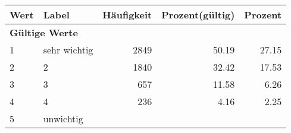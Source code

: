      \begin{longtable}{lXrrr}
     \toprule
     \textbf{Wert} & \textbf{Label} & \textbf{Häufigkeit} & \textbf{Prozent(gültig)} & \textbf{Prozent} \\
     \endhead
     \midrule
     \multicolumn{5}{l}{\textbf{Gültige Werte}}\\

     1 &
     \multicolumn{1}{X}{ sehr wichtig   } &


       \num{2849} &
       \num[round-mode=places,round-precision=2]{50.19} &
         \num[round-mode=places,round-precision=2]{27.15} \\

     2 &
     \multicolumn{1}{X}{ 2   } &


       \num{1840} &
       \num[round-mode=places,round-precision=2]{32.42} &
         \num[round-mode=places,round-precision=2]{17.53} \\

     3 &
     \multicolumn{1}{X}{ 3   } &


       \num{657} &
       \num[round-mode=places,round-precision=2]{11.58} &
         \num[round-mode=places,round-precision=2]{6.26} \\

     4 &
     \multicolumn{1}{X}{ 4   } &


       \num{236} &
       \num[round-mode=places,round-precision=2]{4.16} &
         \num[round-mode=places,round-precision=2]{2.25} \\

     5 &
     \multicolumn{1}{X}{ unwichtig   } &



\end{longtable}

